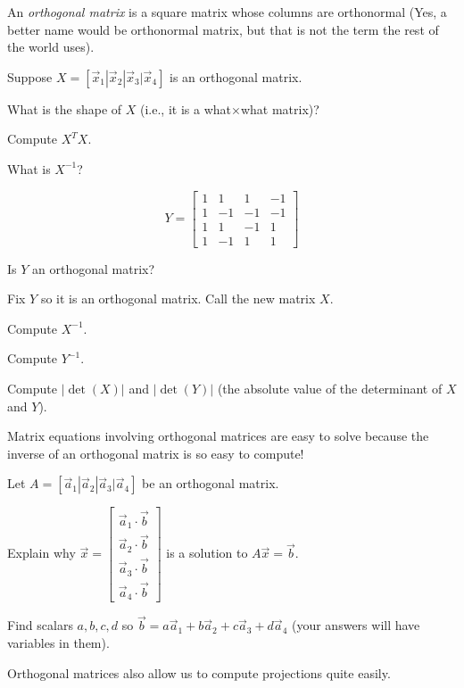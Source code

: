 \documentclass[14pt]{problemset}
\newcommand{\mat}[1]{\begin{bmatrix}#1\end{bmatrix}}
\begin{document}
	\begin{definition}
		An \emph{orthogonal matrix} is a square matrix whose columns are
		orthonormal (Yes, a better name would be orthonormal matrix, but that
		is not the term the rest of the world uses).
	\end{definition}

	\question
	Suppose $X=[\vec x_1|\vec x_2|\vec x_3|\vec x_4]$ is an orthogonal matrix.
	\begin{parts}
		\item What is the shape of $X$ (i.e., it is a what$\times$what matrix)?
		\item Compute $X^TX$.
		\item What is $X^{-1}$?
	\end{parts}

	\question
	\[
		Y=\mat{1&1&1&-1\\1&-1&-1&-1\\1&1&-1&1\\1&-1&1&1}
	\]
	\begin{parts}
		\item Is $Y$ an orthogonal matrix?
		\item Fix $Y$ so it is an orthogonal matrix.  Call the new matrix $X$.
		\item Compute $X^{-1}$.
		\item Compute $Y^{-1}$.
		\item Compute $|\det(X)|$ and $|\det(Y)|$ (the absolute value of
			the determinant of $X$ and $Y$).
	\end{parts}

	Matrix equations involving orthogonal matrices are easy to solve because the
	inverse of an orthogonal matrix is so easy to compute!
	
	\question
	Let $A=[\vec a_1|\vec a_2|\vec a_3|\vec a_4]$ be an orthogonal matrix.
	\begin{parts}
		\item Explain why 
			$\vec x=\mat{\vec a_1\cdot \vec b\\
				     \vec a_2\cdot \vec b\\
			     	     \vec a_3\cdot \vec b\\
			     	     \vec a_4\cdot \vec b}$ is a solution to $A\vec x=\vec b$.
		\item Find scalars $a,b,c,d$ so $\vec b=a\vec a_1+b\vec a_2+c\vec a_3+d\vec a_4$
			(your answers will have variables in them).
	\end{parts}

	Orthogonal matrices also allow us to compute projections quite easily.
\end{document}

